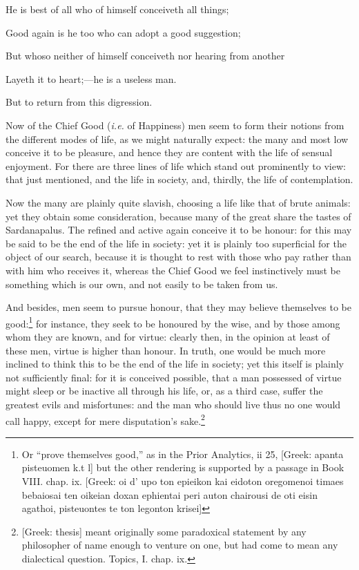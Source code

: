 He is best of all who of himself conceiveth all things;

Good again is he too who can adopt a good suggestion;

But whoso neither of himself conceiveth nor hearing from another

Layeth it to heart;—he is a useless man.


But to return from this digression.

Now of the Chief Good (\emph{i.e.} of Happiness) men seem to form their notions
from the different modes of life, as we might naturally expect: the many and
most low conceive it to be pleasure, and hence they are content with the life
of sensual enjoyment. For there are three lines of life which stand out
prominently to view: that just mentioned, and the life in society, and,
thirdly, the life of contemplation.

Now the many are plainly quite slavish, choosing a life like that of brute
animals: yet they obtain some consideration, because many of the great share
the tastes of Sardanapalus. The refined and active again conceive it to be
honour: for this may be said to be the end of the life in society: yet it is
plainly too superficial for the object of our search, because it is thought to
rest with those who pay rather than with him who receives it, whereas the Chief
Good we feel instinctively must be something which is our own, and not easily
to be taken from us.

And besides, men seem to pursue honour, that they may believe themselves to be
good:\footnote{Or “prove themselves good,” as in the Prior Analytics, ii 25,
[Greek: apanta pisteuomen k.t l] but the other rendering is supported by a
passage in Book VIII. chap. ix. [Greek: oi d’ upo ton epieikon kai
eidoton oregomenoi timaes bebaiosai ten oikeian doxan ephientai peri auton
chairousi de oti eisin agathoi, pisteuontes te ton legonton krisei]} for
instance, they seek to be honoured by the wise, and by those among whom they
are known, and for virtue: clearly then, in the opinion at least of these men,
virtue is higher than honour. In truth, one would be much more inclined to
think this to be the end of the life in society; yet this itself is plainly not
sufficiently final: for it is conceived possible, that a man possessed of
virtue might sleep or be inactive all through his life, or, as a third case,
suffer the greatest evils and misfortunes: and the man who should live thus no
one would call happy, except for mere disputation’s sake.\footnote{[Greek: thesis] meant originally some paradoxical statement by any philosopher
of name enough to venture on one, but had come to mean any dialectical
question. Topics, I. chap. ix.}

